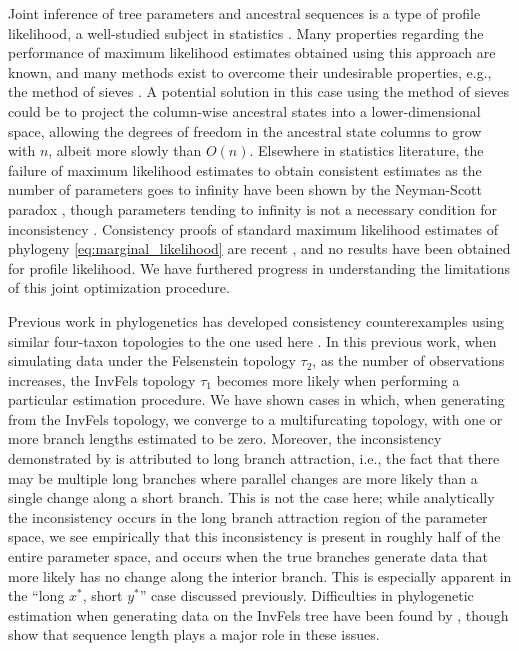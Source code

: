 \documentclass[11pt]{article}
\newcommand{\nCols}{n}
\begin{document}
Joint inference of tree parameters and ancestral sequences is a type of profile likelihood, a well-studied subject in statistics \citep{Murphy2000-ry}.
Many properties regarding the performance of maximum likelihood estimates obtained using this approach are known, and many methods exist to overcome their undesirable properties, e.g., the method of sieves \citep{Geman1982}.
A potential solution in this case using the method of sieves could be to project the column-wise ancestral states into a lower-dimensional space, allowing the degrees of freedom in the ancestral state columns to grow with $\nCols$, albeit more slowly than $O(\nCols)$.
Elsewhere in statistics literature, the failure of maximum likelihood estimates to obtain consistent estimates as the number of parameters goes to infinity have been shown by the Neyman-Scott paradox \citep{Neyman1948-tt}, though parameters tending to infinity is not a necessary condition for inconsistency \citep{LeCam1990}.
Consistency proofs of standard maximum likelihood estimates of phylogeny \eqref{eq:marginal_likelihood} are recent \citep{Allman2008-wd,Chai2011-ff,RoyChoudhury2015-ta}, and no results have been obtained for profile likelihood.
We have furthered progress in understanding the limitations of this joint optimization procedure.

Previous work in phylogenetics has developed consistency counterexamples using similar four-taxon topologies to the one used here \citep{Felsenstein1978-rr}.
In this previous work, when simulating data under the Felsenstein topology $\tau_2$, as the number of observations increases, the InvFels topology $\tau_1$ becomes more likely when performing a particular estimation procedure.
We have shown cases in which, when generating from the InvFels topology, we converge to a multifurcating topology, with one or more branch lengths estimated to be zero.
Moreover, the inconsistency demonstrated by \citet{Felsenstein1978-rr} is attributed to long branch attraction, i.e., the fact that there may be multiple long branches where parallel changes are more likely than a single change along a short branch.
This is not the case here; while analytically the inconsistency occurs in the long branch attraction region of the parameter space, we see empirically that this inconsistency is present in roughly half of the entire parameter space, and occurs when the true branches generate data that more likely has no change along the interior branch.
This is especially apparent in the ``long $x^*$, short $y^*$'' case discussed previously.
Difficulties in phylogenetic estimation when generating data on the InvFels tree have been found by \citet{Siddall1998-hq}, though \citet{Swofford2001-hr} show that sequence length plays a major role in these issues.
\end{document}
